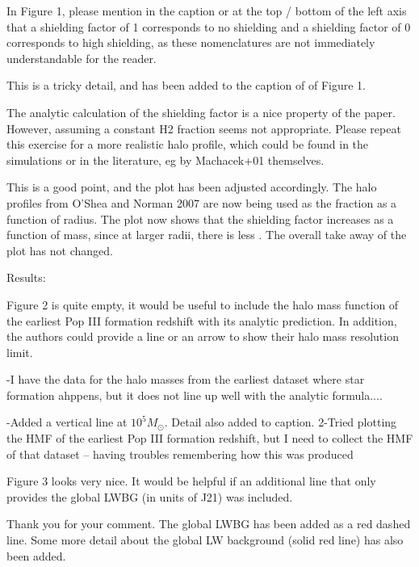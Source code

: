 \documentclass[11pt]{article}
\newenvironment{referee}[1][]{%
    \ignorespaces%
    \begin{mdframed}[style=myquotestyle,#1]%
}{%
    \end{mdframed}%
    \ignorespacesafterend%
}%
\begin{document}
\begin{referee}
In Figure 1, please mention in the caption or at the top / bottom of the left axis that a shielding factor of 1 corresponds to no shielding and a shielding factor of 0 corresponds to high shielding, as these nomenclatures are not immediately understandable for the reader.
\end{referee}
This is a tricky detail, and has been added to the caption of of Figure 1.

\begin{referee}
The analytic calculation of the shielding factor is a nice property of the paper. However, assuming a constant H2 fraction seems not appropriate. Please repeat this exercise for a more realistic halo profile, which could be found in the simulations or in the literature, eg by Machacek+01 themselves.
\end{referee}
This is a good point, and the plot has been adjusted accordingly. The halo profiles from O'Shea and Norman 2007 are now being used as the \hh{} fraction as a function of radius. The plot now shows that the shielding factor increases as a function of mass, since at larger radii, there is less \hh{}. The overall take away of the plot has not changed. 

\begin{referee}
Results:

Figure 2 is quite empty, it would be useful to include the halo mass function of the earliest Pop III formation redshift with its analytic prediction. In addition, the authors could provide a line or an arrow to show their halo mass resolution limit.
\end{referee}
-I have the data for the halo masses from the earliest dataset where star formation ahppens, but it does not line up well with the analytic formula....

-Added a vertical line at $10^5 M_{\odot}$. Detail also added to caption.
2-Tried plotting the HMF of the earliest Pop III formation redshift, but I need to collect the HMF of that dataset -- having troubles remembering how this was produced 


\begin{referee}
Figure 3 looks very nice. It would be helpful if an additional line that only 
provides the global LWBG (in units of J21) was included.
\end{referee}
Thank you for your comment. The global LWBG has been added as a red dashed line. Some more detail about the global LW background (solid red line) has also been added.
\end{document}
